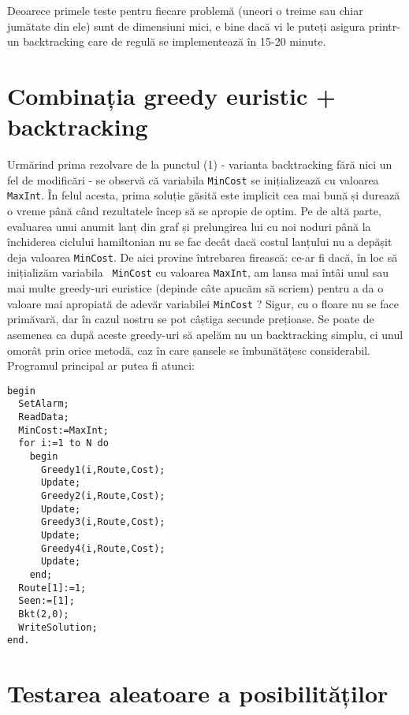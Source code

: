 Deoarece primele teste pentru fiecare problemă (uneori o treime sau chiar
jumătate din ele) sunt de dimensiuni mici, e bine dacă vi le puteți asigura
printr-un backtracking care de regulă se implementează în 15-20 minute.

\section{Combinația greedy euristic + backtracking}

Urmărind prima rezolvare de la punctul (1) - varianta backtracking fără nici
un fel de modificări - se observă că variabila {\tt MinCost} se inițializează
cu valoarea {\tt MaxInt}. În felul acesta, prima soluție găsită este implicit
cea mai bună și durează o vreme până când rezultatele încep să se apropie de
optim. Pe de altă parte, evaluarea unui anumit lanț din graf și prelungirea
lui cu noi noduri până la închiderea ciclului hamiltonian nu se fac decât dacă
costul lanțului nu a depășit deja valoarea {\tt MinCost}. De aici provine
întrebarea firească: ce-ar fi dacă, în loc să inițializăm variabila {\tt
  MinCost} cu valoarea {\tt MaxInt}, am lansa mai întâi unul sau mai multe
greedy-uri euristice (depinde câte apucăm să scriem) pentru a da o valoare mai
apropiată de adevăr variabilei {\tt MinCost} ? Sigur, cu o floare nu se face
primăvară, dar în cazul nostru se pot câștiga secunde prețioase. Se poate de
asemenea ca după aceste greedy-uri să apelăm nu un backtracking simplu, ci
unul omorât prin orice metodă, caz în care șansele se îmbunătățesc
considerabil. Programul principal ar putea fi atunci:

\begin{verbatim}
begin
  SetAlarm;
  ReadData;
  MinCost:=MaxInt;
  for i:=1 to N do
    begin
      Greedy1(i,Route,Cost);
      Update;
      Greedy2(i,Route,Cost);
      Update;
      Greedy3(i,Route,Cost);
      Update;
      Greedy4(i,Route,Cost);
      Update;
    end;
  Route[1]:=1;
  Seen:=[1];
  Bkt(2,0);
  WriteSolution;
end.
\end{verbatim}

\section{Testarea aleatoare a posibilităților}

